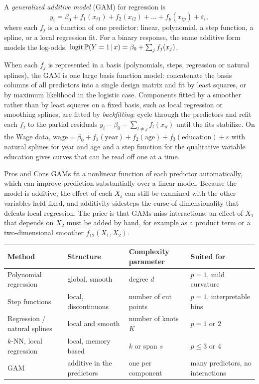 \begin{definition}\label{def:gam}
A \emph{generalized additive model} (GAM) for regression is
\[
y_i=\beta_0+f_1(x_{i1})+f_2(x_{i2})+\dots+f_p(x_{ip})+\varepsilon_i ,
\]
where each $f_j$ is a function of one predictor: linear, polynomial, a step function, a spline, or a local regression fit. For a binary response, the same additive form models the log-odds, $\mathrm{logit}\,\mathbb{P}(Y=1\,|\, x)=\beta_0+\sum_jf_j(x_j)$.
\end{definition}

When each $f_j$ is represented in a basis (polynomials, steps, regression or natural splines), the GAM is one large basis function model: concatenate the basis columns of all predictors into a single design matrix and fit by least squares, or by maximum likelihood in the logistic case. Components fitted by a smoother rather than by least squares on a fixed basis, such as local regression or smoothing splines, are fitted by \emph{backfitting}: cycle through the predictors and refit each $f_j$ to the partial residuals $y_i-\beta_0-\sum_{l\ne j}f_l(x_{il})$ until the fits stabilize. On the Wage data, $\text{wage}=\beta_0+f_1(\text{year})+f_2(\text{age})+f_3(\text{education})+\varepsilon$ with natural splines for year and age and a step function for the qualitative variable education gives curves that can be read off one at a time.

\begin{notebox}{Pros and Cons}
GAMs fit a nonlinear function of each predictor automatically, which can improve prediction substantially over a linear model. Because the model is additive, the effect of each $X_j$ can still be examined with the other variables held fixed, and additivity sidesteps the curse of dimensionality that defeats local regression. The price is that GAMs miss interactions: an effect of $X_1$ that depends on $X_2$ must be added by hand, for example as a product term or a two-dimensional smoother $f_{12}(X_1,X_2)$.
\end{notebox}

\begin{center}
\small
\begin{tabularx}{\textwidth}{@{}l>{\raggedright\arraybackslash}X>{\raggedright\arraybackslash}X>{\raggedright\arraybackslash}X@{}}
\toprule
Method & Structure & Complexity parameter & Suited for \\
\midrule
Polynomial regression & global, smooth & degree $d$ & $p=1$, mild curvature \\
Step functions & local, discontinuous & number of cut points & $p=1$, interpretable bins \\
Regression / natural splines & local and smooth & number of knots $K$ & $p=1$ or $2$ \\
$k$-NN, local regression & local, memory based & $k$ or span $s$ & $p\le3$ or $4$ \\
GAM & additive in the predictors & one per component & many predictors, no interactions \\
\bottomrule
\end{tabularx}
\end{center}

